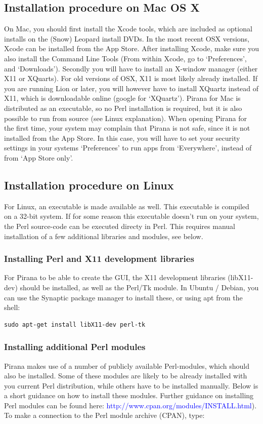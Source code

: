 \subsection{Installation procedure on Mac OS X} On Mac, you should
first install the Xcode tools, which are
included as optional installs on the (Snow) Leopard install DVDs. In the most recent OSX versions, Xcode can be installed from the App Store. After installing Xcode, make sure you also install the Command Line Tools (From within Xcode, go to `Preferences', and `Downloads'). Secondly you will have to install an X-window manager (either X11 or XQuarts). For old versions of OSX, X11 is most likely already installed. If you are running Lion or later, you will however have to install XQuartz instead of X11, which is downloadable online (google for `XQuartz'). Pirana for Mac is distributed as an executable, so no Perl installation is required, but it is also possible to run from source (see Linux explanation). When opening Pirana for the first time, your system may complain that Pirana is not safe, since it is not installed from the App Store. In this case, you will have to set your security settings in your systems `Preferences' to run apps from `Everywhere', instead of from `App Store only'.

\subsection{Installation procedure on Linux} For Linux, an executable
is made available as well. This executable is compiled on a 32-bit
system. If for some reason this executable doesn't run on your system,
the Perl source-code can be executed directy in Perl. This requires
manual installation of a few additional libraries and modules, see below.

\subsubsection*{Installing Perl and X11 development libraries}
For Pirana to be able to create the GUI, the X11 development libraries
(libX11-dev) should be installed, as well as the Perl/Tk module. In
Ubuntu / Debian, you can use the Synaptic package manager to install
these, or using apt from the shell:

\begin{lstlisting}
sudo apt-get install libX11-dev perl-tk
\end{lstlisting}

\subsubsection*{Installing additional Perl modules}
\noindent Pirana makes use of a number of publicly available
Perl-modules, which should also be installed. Some of these modules
are likely to be already installed with you current Perl distribution,
while others have to be installed manually. Below is a short guidance
on how to install these modules. Further guidance on installing Perl
modules can be found here: \textcolor{Blue}{
  http://www.cpan.org/modules/INSTALL.html}). To make a connection to
the Perl module archive (CPAN), type:

